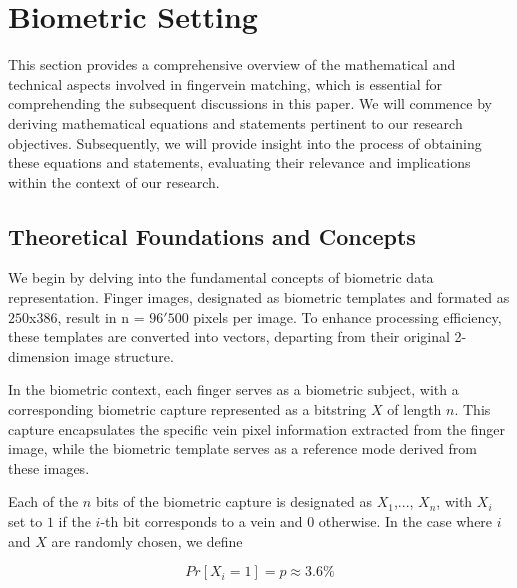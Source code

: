 \section{Biometric Setting}

This section provides a comprehensive overview of the mathematical and technical aspects involved in fingervein matching, which is essential for comprehending the subsequent discussions in this paper. We will commence by deriving mathematical equations and statements pertinent to our research objectives. Subsequently, we will provide insight into the process of obtaining these equations and statements, evaluating their relevance and implications within the context of our research. 


\subsection{Theoretical Foundations and Concepts}

We begin by delving into the fundamental concepts of biometric data representation. Finger images, designated as biometric templates and formated as \(250\)x\(386\), result in n = \(96'500\) pixels per image. To enhance processing efficiency, these templates are converted into vectors, departing from their original 2-dimension image structure. 

In the biometric context, each finger serves as a biometric subject, with a corresponding biometric capture represented as a bitstring \(X\) of length \(n\). This capture encapsulates the specific vein pixel information extracted from the finger image, while the biometric template serves as a reference mode derived from these images. 

Each of the \(n\) bits of the biometric capture is designated as \(X_1\),..., \(X_n\), with \(X_i\) set to \(1\) if the \(i\)-th bit corresponds to a vein and \(0\) otherwise. In the case where \(i\) and \(X\) are randomly chosen, we define 

\begin{equation} \label{eq:p}
    Pr[X_i = 1] = p \approx 3.6 \% 
\end{equation}

